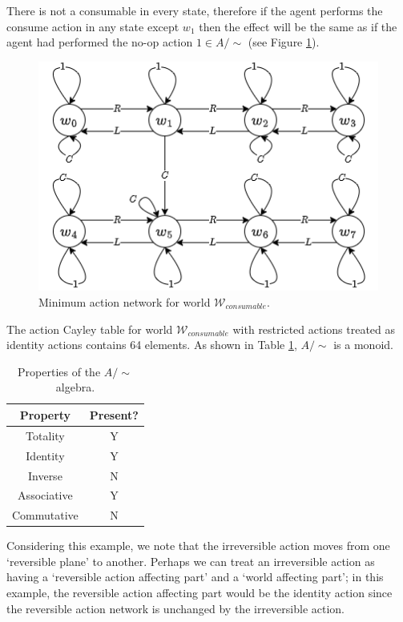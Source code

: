 There is not a consumable in every state, therefore if the agent performs the consume action in any state except $w_{1}$ then the effect will be the same as if the agent had performed the no-op action $1 \in A/\sim$ (see Figure \ref{fig:min-action-net-world-with-consumable-identity}).

\begin{figure}[H]
    \centering
    \includegraphics[width=0.7\linewidth]{5BeyondSBDRL/Old/Images/fig-min-action-net-world-with-consumable-identity.png}
    \caption{
   Minimum action network for world $\mathscr{W}_{consumable}$.
    }
    \label{fig:min-action-net-world-with-consumable-identity}
\end{figure}

The action Cayley table for world $\mathscr{W}_{consumable}$ with restricted actions treated as identity actions contains 64 elements.
As shown in Table \ref{tab:identity-consumable-properties}, $A/\sim$ is a monoid.

\begin{table}[H]
    \centering
    \begin{tabular}{c|c}
        \textbf{Property}   & \textbf{Present?} \\
        \hline
        Totality            & Y\\
        Identity            & Y\\
        Inverse             & N\\
        Associative         & Y\\
        Commutative         & N
    \end{tabular}
    \caption{Properties of the $A/\sim$ algebra.}
    \label{tab:identity-consumable-properties}
\end{table}

\begin{remark}
    Considering this example, we note that the irreversible action moves from one `reversible plane' to another.
    Perhaps we can treat an irreversible action as having a `reversible action affecting part' and a `world affecting part'; in this example, the reversible action affecting part would be the identity action since the reversible action network is unchanged by the irreversible action.
\end{remark}

